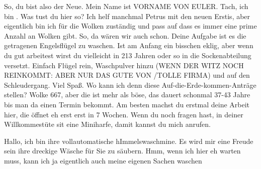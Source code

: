 \begin{verseplay}[5em]
\s{\Euler} So, du bist also der Neue. Mein Name ist VORNAME VON EULER.
\s{\Gandalf} Tach, ich bin \Gandalf. Was tust du hier so?
\s{\Euler} Ich helf manchmal Petrus mit den neuen Erstis, aber eigentlich bin ich für die Wolken zuständig und pass auf dass es immer eine prime Anzahl an Wolken gibt. So, da wären wir auch schon. Deine Aufgabe ist es die getragenen Engelsflügel zu waschen. Ist am Anfang ein bisschen eklig, aber wenn du gut arbeitest wirst du vielleicht in 213 Jahren oder so in die Sockenabteilung versetzt. Einfach Flügel rein, Waschpulver hinzu (WENN DER WITZ NOCH REINKOMMT: ABER NUR DAS GUTE VON /TOLLE FIRMA) und auf den Schleudergang. Viel Spaß.
\s{\Gandalf} Wo kann ich denn diese Auf-die-Erde-kommen-Anträge stellen?
\s{\Euler} Wolke 667, aber die ist mehr als böse, das dauert schonmal 37-43 Jahre bis man da einen Termin bekommt. Am besten machst du erstmal deine Arbeit hier, die öffnet eh erst erst in 7 Wochen. Wenn du noch fragen hast, in deiner Willkommestüte sit eine Miniharfe, damit kannst du mich anrufen.
\end{verseplay}
\begin{verseplay}[5em]
\s{\Waschmaschine} Hallo, ich bin ihre vollautomatische hImmelswaschmine. Es wird mir eine Freude sein ihre dreckige Wäsche für Sie zu säubern.
\s{\Gandalf} Hmm, wenn ich hier eh warten muss, kann ich ja eigentlich auch meine eigenen Sachen waschen
\end{verseplay}

